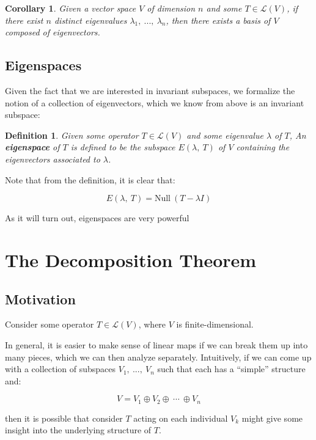 \documentclass[10pt, oneside]{article}
\newtheorem{defn}{Definition}
\newtheorem{cor}{Corollary}
\begin{document}
    \begin{cor}
      Given a vector space $V$ of dimension $n$ and some $T \in \mathcal{L}(V)$,
      if there exist $n$ distinct eigenvalues $\lambda_1, \ ..., \ \lambda_n$, then there exists a
      basis of $V$ composed of eigenvectors.
    \end{cor}

    \subsection{Eigenspaces}

    Given the fact that we are interested in invariant subspaces, we formalize the notion of a
    collection of eigenvectors,
    which we know from above is an invariant subspace:

      \begin{defn}
     Given some operator $T \in \mathcal{L}(V)$ and some eigenvalue $\lambda$ of $T$,
     An \textbf{eigenspace} of $T$ is defined to be the
     subspace $E(\lambda, \ T)$ of $V$ containing the eigenvectors associated to $\lambda$.
   \end{defn}

   Note that from the definition, it is clear that:

   $$E(\lambda, \ T) = \text{Null} \ (T - \lambda I)$$

   As it will turn out, eigenspaces are very powerful
     
      \section{The Decomposition Theorem}

      \subsection{Motivation}

    Consider some operator $T \in \mathcal{L}(V)$, where $V$ is finite-dimensional.
    \newline

    In general, it is easier to make sense of linear maps if we can break them up
    into many pieces, which we can then analyze separately. Intuitively, if we can
    come up with a collection of subspaces $V_1, \ ..., \ V_n$ such that each has a ``simple''
    structure and:

    $$V = V_1 \oplus V_2 \oplus \ \cdots \ \oplus V_n$$

    then it is possible that consider $T$ acting on each individual $V_k$ might give some insight
    into the underlying structure of $T$.
    \newline
\end{document}
